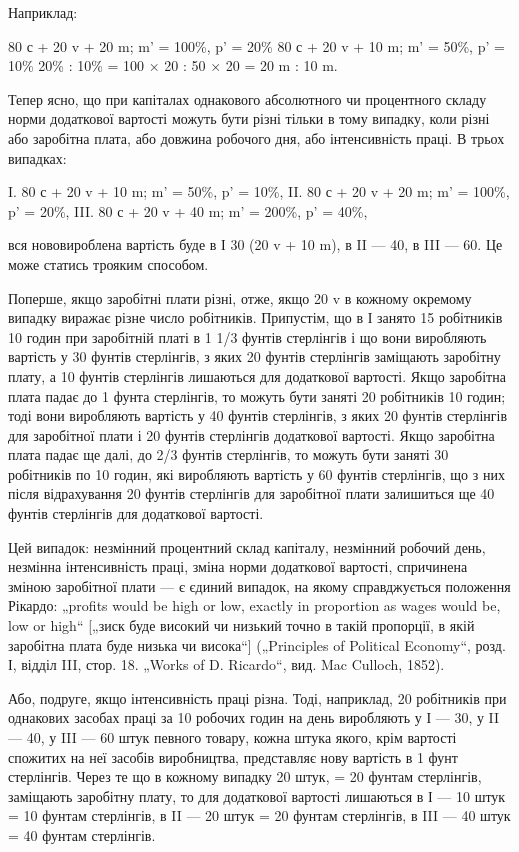 
Наприклад:

80 с + 20 v + 20 m; m' = 100\%, p' = 20\%
80 с + 20 v + 10 m; m' = 50\%, p' = 10\%
20\% : 10\% = 100 × 20 : 50 × 20 = 20 m : 10 m.

Тепер ясно, що при капіталах однакового абсолютного чи
процентного складу норми додаткової вартості можуть бути
різні тільки в тому випадку, коли різні або заробітна плата,
або довжина робочого дня, або інтенсивність праці. В трьох
випадках:

I.  80 с + 20 v + 10 m; m' = 50\%, p' = 10\%,
II. 80 с + 20 v + 20 m; m' = 100\%, p' = 20\%,
III. 80 с + 20 v + 40 m; m' = 200\%, p' = 40\%,

вся нововироблена вартість буде в І 30 (20 v + 10 m), в II — 40,
в III — 60. Це може статись трояким способом.

Поперше, якщо заробітні плати різні, отже, якщо 20 v в кожному
окремому випадку виражає різне число робітників. Припустім,
що в І занято 15 робітників 10 годин при заробітній
платі в 1  1/3  фунтів стерлінгів і що вони виробляють вартість
у 30 фунтів стерлінгів, з яких 20 фунтів стерлінгів заміщають
заробітну плату, а 10 фунтів стерлінгів лишаються для додаткової
вартості. Якщо заробітна плата падає до 1 фунта стерлінгів,
то можуть бути заняті 20 робітників 10 годин; тоді вони
виробляють вартість у 40 фунтів стерлінгів, з яких 20 фунтів
стерлінгів для заробітної плати і 20 фунтів стерлінгів додаткової
вартості. Якщо заробітна плата падає ще далі, до 2/3 фунтів
стерлінгів, то можуть бути заняті 30 робітників по 10 годин,
які виробляють вартість у 60 фунтів стерлінгів, що з них після
відрахування 20 фунтів стерлінгів для заробітної плати залишиться
ще 40 фунтів стерлінгів для додаткової вартості.

Цей випадок: незмінний процентний склад капіталу, незмінний
робочий день, незмінна інтенсивність праці, зміна норми
додаткової вартості, спричинена зміною заробітної плати — є
єдиний випадок, на якому справджується положення Рікардо:
„profits would be high or low, exactly in proportion as wages
would be, low or high“ [„зиск буде високий чи низький точно
в такій пропорції, в якій заробітна плата буде низька чи висока“]
(„Principles of Political Economy“, розд. І, відділ III, стор. 18.
„Works of D. Ricardo“, вид. Mac Culloch, 1852).

Або, подруге, якщо інтенсивність праці різна. Тоді, наприклад,
20 робітників при однакових засобах праці за 10 робочих
годин на день виробляють у І — 30, у II — 40, у III — 60 штук
певного товару, кожна штука якого, крім вартості спожитих
на неї засобів виробництва, представляє нову вартість в 1 фунт
стерлінгів. Через те що в кожному випадку 20 штук, = 20
фунтам стерлінгів, заміщають заробітну плату, то для додаткової
вартості лишаються в І — 10 штук = 10 фунтам стерлінгів,
в II — 20 штук = 20 фунтам стерлінгів, в III — 40 штук = 40 фунтам
стерлінгів.

